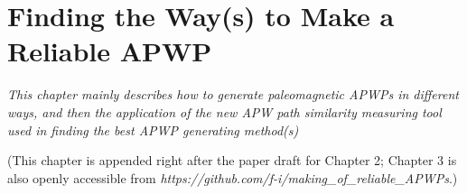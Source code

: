 \chapter{Finding the Way(s) to Make a Reliable APWP}\label{chap:Reliab}
\textit{This chapter mainly describes how to generate paleomagnetic APWPs in
different ways, and then the application of the new APW path similarity
measuring tool used in finding the best APWP generating method(s)}
\vfill
\minitoc\newpage

(This chapter is appended right after the paper draft for Chapter 2; Chapter 3
is also openly accessible from
\emph{https://github.com/f-i/making\_of\_reliable\_APWPs}.)
